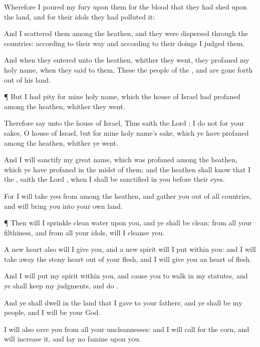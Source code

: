 {Wherefore I
poured my
fury upon them for the
blood that they had
shed upon the
land, and for their
idols
{} they had
polluted it:

And I
scattered them among the
heathen, and they were
dispersed through the
countries: according to their
way and according to their
doings I
judged them.

And when they
entered unto the
heathen, whither they
went, they
profaned my
holy
name, when they
said to them, These
{} the
people of the
{}, and are gone
forth out of his
land.


\par }{\PP {}¶ But I had
pity for mine
holy
name, which the
house of
Israel had
profaned among the
heathen, whither they
went.

Therefore
say unto the
house of
Israel, Thus
saith the
Lord
{}; I
do not
{} for your sakes, O
house of
Israel, but for mine
holy
name’s sake, which ye have
profaned among the
heathen, whither ye
went.

And I will
sanctify my
great
name, which was
profaned among the
heathen, which ye have
profaned in the
midst of them; and the
heathen shall
know that I
{} the
{},
saith the
Lord
{}, when I shall be
sanctified in you before their
eyes.

For I will
take you from
among the
heathen, and
gather you out of all
countries, and will
bring you into your own
land.


\par }{\PP {}¶ Then will I
sprinkle
clean
water upon you, and ye shall be
clean: from all your
filthiness, and from all your
idols, will I
cleanse you.

A
new
heart also will I
give you, and a
new
spirit will I
put
within you: and I will take
away the
stony
heart out of your
flesh, and I will
give you an
heart of
flesh.

And I will
put my
spirit
within you, and
cause you to
walk in my
statutes, and ye shall
keep my
judgments, and
do
{}.

And ye shall
dwell in the
land that I
gave to your
fathers; and ye shall be my
people, and I will be your
God.

I will also
save you from all your
uncleannesses: and I will
call for the
corn, and will
increase it, and
lay no
famine upon you.

}
